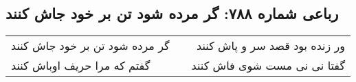 \begin{center}
\section*{رباعی شماره ۷۸۸: گر مرده شود تن بر خود جاش کنند}
\label{sec:0788}
\begin{longtable}{l p{0.5cm} r}
گر مرده شود تن بر خود جاش کنند
&&
ور زنده بود قصد سر و پاش کنند
\\
گفتم که مرا حریف اوباش کنند
&&
گفتا نی نی مست شوی فاش کنند
\\
\end{longtable}
\end{center}
